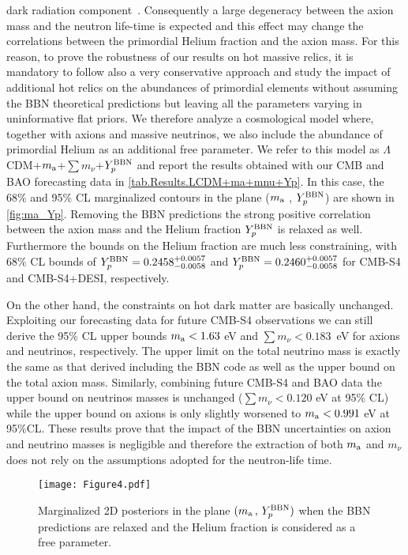 \documentclass[fleqn,usenatbib,letters]{mnras}
\begin{document}
dark radiation component~\citep{Capparelli:2017tyx}. Consequently a large degeneracy between the axion mass and the neutron life-time is expected and this effect may change the correlations between the primordial Helium fraction and the axion mass. For this reason, to prove the robustness of our results on hot massive relics, it is mandatory to follow also a very conservative approach and study the impact of additional hot relics on the abundances of primordial elements without assuming the BBN theoretical predictions but leaving all the parameters varying in uninformative flat priors. We therefore analyze a cosmological model where, together with axions and massive neutrinos, we also include the abundance of primordial Helium as an additional free parameter. We refer to this model as $\Lambda$CDM+$m_{\rm a}$+$\sum m_{\nu}$+$Y_p^{\rm BBN}$ and report the results obtained with our CMB and BAO forecasting data in \autoref{tab.Results.LCDM+ma+mnu+Yp}. In this case, the 68\% and 95\% CL marginalized contours in the plane ($m_{\rm a}$ , $Y_p^{\rm BBN}$) are shown in \autoref{fig:ma_Yp}. Removing the BBN predictions the strong positive correlation between the axion mass and the Helium fraction $Y_p^{\rm BBN}$ is relaxed as well. Furthermore the bounds on the Helium fraction are much less constraining, with 68\% CL bounds of $Y_p^{\rm BBN}=0.2458^{+0.0057}_{-0.0058}$ and $Y_p^{\rm BBN}=0.2460^{+0.0057}_{-0.0058}$ for CMB-S4 and CMB-S4+DESI, respectively.

On the other hand, the constraints on hot dark matter are basically unchanged. Exploiting our forecasting data for future CMB-S4 observations we can still derive the 95\% CL upper bounds $m_{\rm a}<1.63$ eV and $\sum m_{\nu}<0.183$~eV for axions and neutrinos, respectively. The upper limit on the total neutrino mass is exactly the same as that derived including the BBN code as well as the upper bound on the total axion mass. Similarly, combining future CMB-S4 and BAO data the upper bound on neutrinos masses is unchanged ($\sum m_{\nu}<0.120$ eV at 95\% CL) while the upper bound on axions is only slightly worsened to $m_{\rm a}<0.991$ eV at 95\%CL. These results prove that the impact of the BBN uncertainties on axion and neutrino masses is negligible and therefore the extraction of both $m_{\rm a}$  and $m_{\nu}$ does not rely on the assumptions adopted for the neutron-life time.





\begin{figure}
    \centering
    \texttt{[image: Figure4.pdf]}
\caption{Marginalized 2D posteriors in the plane $(m_{\rm a}\,,\,Y_p^{\rm BBN})$ when the BBN predictions are relaxed and the Helium fraction is considered as a free parameter.}
\label{fig:ma_Yp}
\end{figure}
\end{document}
